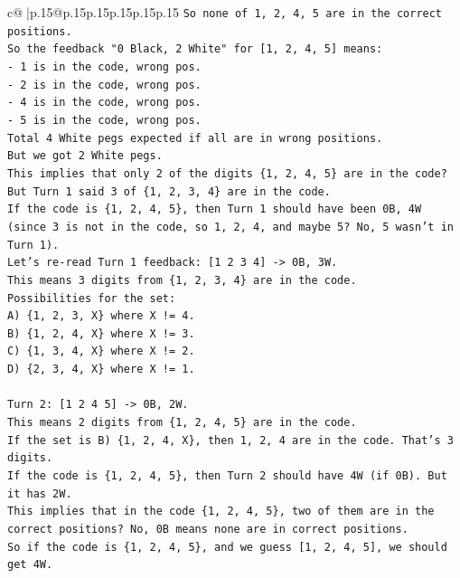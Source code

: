 \documentclass{article}
\begin{document}
{\begin{supertabular}{c@{$\;$}|p{.15\linewidth}@{}p{.15\linewidth}p{.15\linewidth}p{.15\linewidth}p{.15\linewidth}p{.15\linewidth}}
{{{\texttt{So none of 1, 2, 4, 5 are in the correct positions.} \\
\texttt{So the feedback "0 Black, 2 White" for {[}1, 2, 4, 5{]} means:} \\
\texttt{{-} 1 is in the code, wrong pos.} \\
\texttt{{-} 2 is in the code, wrong pos.} \\
\texttt{{-} 4 is in the code, wrong pos.} \\
\texttt{{-} 5 is in the code, wrong pos.} \\
\texttt{Total 4 White pegs expected if all are in wrong positions.} \\
\texttt{But we got 2 White pegs.} \\
\texttt{This implies that only 2 of the digits \{1, 2, 4, 5\} are in the code?} \\
\texttt{But Turn 1 said 3 of \{1, 2, 3, 4\} are in the code.} \\
\texttt{If the code is \{1, 2, 4, 5\}, then Turn 1 should have been 0B, 4W (since 3 is not in the code, so 1, 2, 4, and maybe 5? No, 5 wasn't in Turn 1).} \\
\texttt{Let's re{-}read Turn 1 feedback: {[}1 2 3 4{]} {-}> 0B, 3W.} \\
\texttt{This means 3 digits from \{1, 2, 3, 4\} are in the code.} \\
\texttt{Possibilities for the set:} \\
\texttt{A) \{1, 2, 3, X\} where X != 4.} \\
\texttt{B) \{1, 2, 4, X\} where X != 3.} \\
\texttt{C) \{1, 3, 4, X\} where X != 2.} \\
\texttt{D) \{2, 3, 4, X\} where X != 1.} \\
\\ 
\texttt{Turn 2: {[}1 2 4 5{]} {-}> 0B, 2W.} \\
\texttt{This means 2 digits from \{1, 2, 4, 5\} are in the code.} \\
\texttt{If the set is B) \{1, 2, 4, X\}, then 1, 2, 4 are in the code. That's 3 digits.} \\
\texttt{If the code is \{1, 2, 4, 5\}, then Turn 2 should have 4W (if 0B). But it has 2W.} \\
\texttt{This implies that in the code \{1, 2, 4, 5\}, two of them are in the correct positions? No, 0B means none are in correct positions.} \\
\texttt{So if the code is \{1, 2, 4, 5\}, and we guess {[}1, 2, 4, 5{]}, we should get 4W.} \\
}}}
\end{supertabular}}
\end{document}
